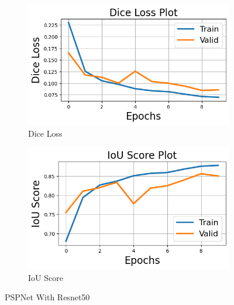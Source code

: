 \documentclass[12pt]{article}
\begin{document}
\begin{figure}[H]
  \begin{subfigure}[b]{0.5\textwidth}
    \includegraphics[width=\textwidth]{Figs/pspnetwithresnetdice.png}
    \caption{Dice Loss}
    \label{fig:f1}
  \end{subfigure}
  \hfill
  \begin{subfigure}[b]{0.5\textwidth}
    \includegraphics[width=\textwidth]{Figs/pspnetwithresnetiou.png}
    \caption{IoU Score}
    \label{fig:f2}
  \end{subfigure}
  \caption{PSPNet With Resnet50}
\end{figure}
\end{document}
